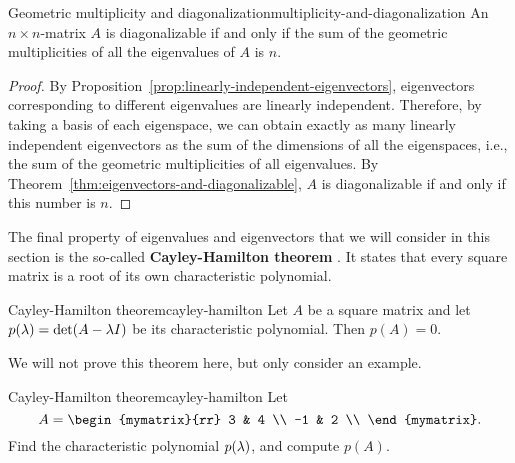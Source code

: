 \begin{theorem}{Geometric multiplicity and diagonalization}{multiplicity-and-diagonalization}
  An $n\times n$-matrix $A$ is diagonalizable if and only if the sum
  of the geometric multiplicities of all the eigenvalues of $A$ is
  $n$.
\end{theorem}

\begin{proof}
  By Proposition~\ref{prop:linearly-independent-eigenvectors},
  eigenvectors corresponding to different eigenvalues are linearly
  independent. Therefore, by taking a basis of each eigenspace, we can
  obtain exactly as many linearly independent eigenvectors as the sum
  of the dimensions of all the eigenspaces, i.e., the sum of the
  geometric multiplicities of all eigenvalues. By
  Theorem~\ref{thm:eigenvectors-and-diagonalizable}, $A$ is
  diagonalizable if and only if this number is $n$.
\end{proof}

The final property of eigenvalues and eigenvectors that we will
consider in this section is the so-called \textbf{Cayley-Hamilton
  theorem}%
%
%
. It states that every square
matrix is a root of its own characteristic polynomial.

\begin{theorem}{Cayley-Hamilton theorem}{cayley-hamilton}
  Let $A$ be a square matrix and let $p(\lambda)=\det(A-\lambda
  I)$ be its characteristic polynomial. Then $p(A)=0$.
\end{theorem}

We will not prove this theorem here, but only consider an example.

\begin{example}{Cayley-Hamilton theorem}{cayley-hamilton}
  Let
  \begin{equation*}
    A = \begin{mymatrix}{rr}
      3 & 4 \\
      -1 & 2 \\
    \end{mymatrix}.
  \end{equation*}
  Find the characteristic polynomial $p(\lambda)$, and compute
  $p(A)$.
\end{example}

